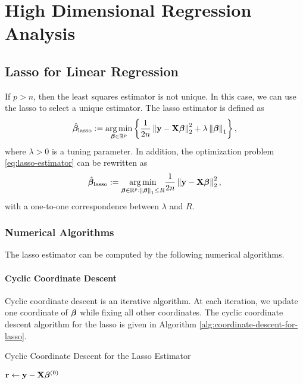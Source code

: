 \chapter{High Dimensional Regression Analysis}

\section{Lasso for Linear Regression}

If $p>n$, then the least squares estimator is not unique. In this case, we can use the lasso to select a unique estimator. The lasso estimator is defined as
\begin{equation}
	\label{eq:lasso-estimator}
	\hat{\boldsymbol{\beta}}_{\text{lasso}}:=\underset{\boldsymbol{\beta}\in{\mathbb R}^{p}}{\arg\min}\left\{\frac{1}{2n}\left\|{\bf y}-{\bf X}\boldsymbol{\beta}\right\|_{2}^{2}+\lambda\left\|\boldsymbol{\beta}\right\|_{1}\right\},
\end{equation}
where $\lambda>0$ is a tuning parameter. In addition, the optimization problem \eqref{eq:lasso-estimator} can be rewritten as
\begin{equation*}
	\hat{\boldsymbol{\beta}}_{\text{lasso}}:=\underset{\boldsymbol{\beta}\in{\mathbb R}^{p}:\left\|\boldsymbol{\beta}\right\|_{1}\leq R}{\arg\min}\frac{1}{2n}\left\|{\bf y}-{\bf X}\boldsymbol{\beta}\right\|_{2}^{2},
\end{equation*}
with a one-to-one correspondence between $\lambda$ and $R$.

\subsection{Numerical Algorithms}

The lasso estimator can be computed by the following numerical algorithms.

\subsubsection{Cyclic Coordinate Descent}

Cyclic coordinate descent is an iterative algorithm. At each iteration, we update one coordinate of $\boldsymbol{\beta}$ while fixing all other coordinates.
The cyclic coordinate descent algorithm for the lasso is given in Algorithm \ref{alg:coordinate-descent-for-lasso}.

\begin{algorithm}[H]
	\caption{Cyclic Coordinate Descent for the Lasso Estimator}
	\label{alg:coordinate-descent-for-lasso}
	${\bf r} \leftarrow {\bf y}-{\bf X}\boldsymbol{\beta}^{(0)}$\;
\end{algorithm}

